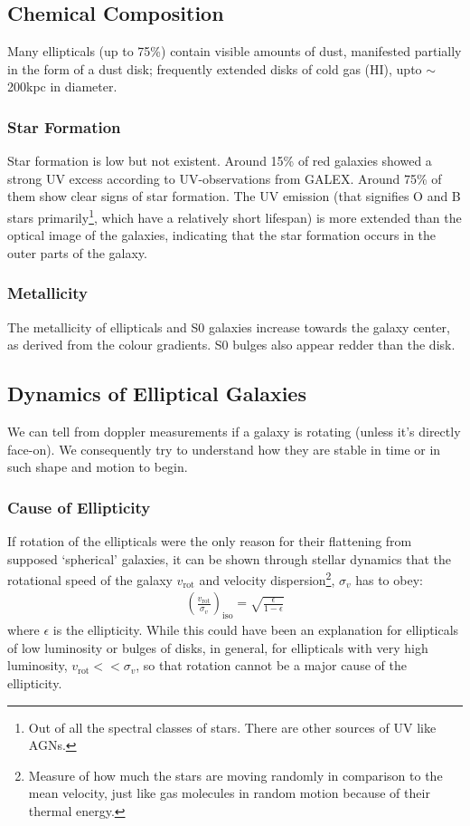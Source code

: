 \documentclass[a4paper,11pt]{report}
\begin{document}
\subsection{Chemical Composition}
Many ellipticals (up to 75\%) contain visible amounts of dust, manifested partially in the form of a dust disk; frequently extended disks of cold gas (H\RN{1}), upto $\sim$200kpc in diameter.

\subsubsection{Star Formation}

Star formation is low but not existent. Around 15\% of red galaxies showed a strong UV excess according to UV-observations from GALEX. Around 75\% of them show clear signs of star formation. The UV emission (that signifies O and B stars primarily\footnote{Out of all the spectral classes of stars. There are other sources of UV like AGNs.}, which have a relatively short lifespan) is more extended than the optical image of the galaxies, indicating that the star formation occurs in the outer parts of the galaxy.

\subsubsection{Metallicity}
The metallicity of ellipticals and S0 galaxies increase towards the galaxy center, as derived from the colour gradients. S0 bulges also appear redder than the disk.

\subsection{Dynamics of Elliptical Galaxies}
We can tell from doppler measurements if a galaxy is rotating (unless it's directly face-on). We consequently try to understand how they are stable in time or in such shape and motion to begin.

\subsubsection{Cause of Ellipticity}
If rotation of the ellipticals were the only reason for their flattening from supposed `spherical' galaxies, it can be shown through stellar dynamics that the rotational speed of the galaxy $v_\text{rot}$ and velocity dispersion\footnote{Measure of how much the stars are moving randomly in comparison to the mean velocity, just like gas molecules in random motion because of their thermal energy.}, $\sigma_v$ has to obey:
\begin{align*}
  \left( \frac{v_\text{rot}}{\sigma_v} \right)_\text{iso} = \sqrt{\frac{\epsilon}{1 - \epsilon}}
\end{align*}
where $\epsilon$ is the ellipticity. While this could have been an explanation for ellipticals of low luminosity or bulges of disks, in general, for ellipticals with very high luminosity, $v_\text{rot} << \sigma_v$, so that rotation cannot be a major cause of the ellipticity.
\end{document}
